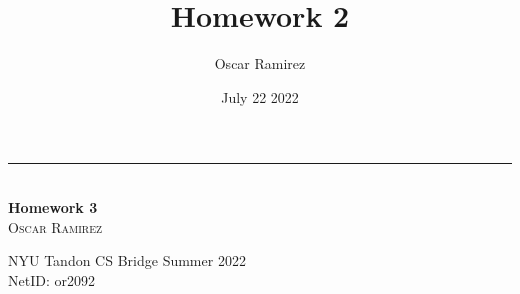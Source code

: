 \documentclass[12pt, letterpaper, twoside]{article}
\title{\textbf{Homework 2}}
\author{Oscar Ramirez}
\date{July 22 2022}
\begin{document}
\begin{titlepage}

    \raggedleft %

    \rule{1pt}{\textheight} %
    \hspace{0.05\textwidth} %
    \parbox[b]{0.75\textwidth}{ %
        {\large\textit{}}\\[4\baselineskip]

        {\Huge\bfseries Homework 3}\\[2\baselineskip] %

        {\Large\textsc{Oscar Ramirez}} %

        \vspace{0.47\textheight} %
        {\noindent NYU Tandon CS Bridge Summer 2022}\\[0.1\baselineskip]
        {\noindent NetID: or2092}\\[\baselineskip]
    }

\end{titlepage}
\newpage
\end{document}
